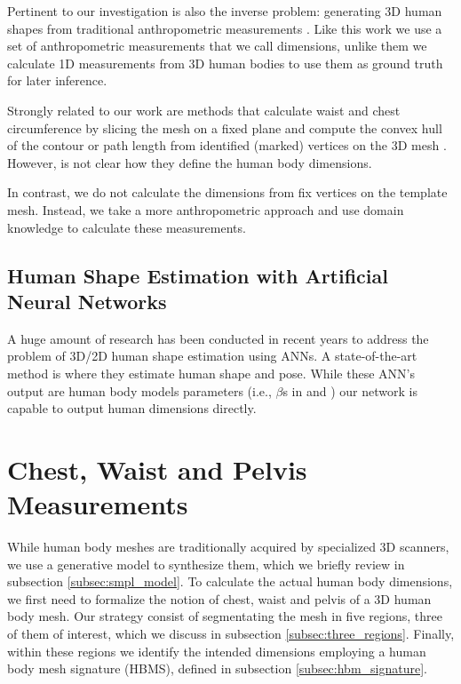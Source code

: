 \documentclass[runningheads, orivec]{llncs}
\begin{document}
Pertinent to our investigation is also the inverse problem: generating 3D human 
shapes from traditional anthropometric measurements \cite{Wuhrer.2013}. Like this work we use a set of 
anthropometric measurements that we call dimensions, unlike them we calculate 
1D measurements from 3D human bodies to use them as ground truth for later 
inference.

Strongly related to our work are methods that calculate waist and 
chest circumference by slicing the mesh on a fixed plane and compute the convex hull of the contour \cite{Guan.2013} or path length from identified (marked) 
vertices on the 3D mesh \cite{Boisvert.2013,Dibra.2016a,Dibra.2016b}. However, is not clear how they define the human body dimensions.

In contrast, we do not 
calculate the dimensions from fix vertices on the template 
mesh. Instead, we 
take a more anthropometric approach and use domain knowledge to calculate these 
measurements.

\subsection{Human Shape Estimation with Artificial Neural Networks}
A huge amount of research has been conducted in recent years to address the 
problem of 3D/2D human shape estimation using ANNs. A state-of-the-art method 
is \cite{kanazawaHMR18} where they estimate human 
shape and pose. While these ANN's output are human body models parameters 
(i.e., $\beta$s in \cite{Dibra.2016a} and \cite{varol18_bodynet}) our network 
is 
capable to output human dimensions directly.

\section{Chest, Waist and Pelvis Measurements}\label{sec:approach}
While human body 
meshes are traditionally acquired by specialized 3D scanners, we use a 
generative model to synthesize them, which we briefly review in 
subsection \ref{subsec:smpl_model}. To calculate the actual human body 
dimensions, we first need to formalize the 
notion of chest, waist and pelvis of a 3D human body mesh. Our strategy consist 
of segmentating the mesh in five regions, 
three of them of interest, which we 
discuss in subsection \ref{subsec:three_regions}. Finally, within these regions 
we identify the intended dimensions employing a human body mesh signature 
(HBMS), 
defined in subsection \ref{subsec:hbm_signature}.
\end{document}
